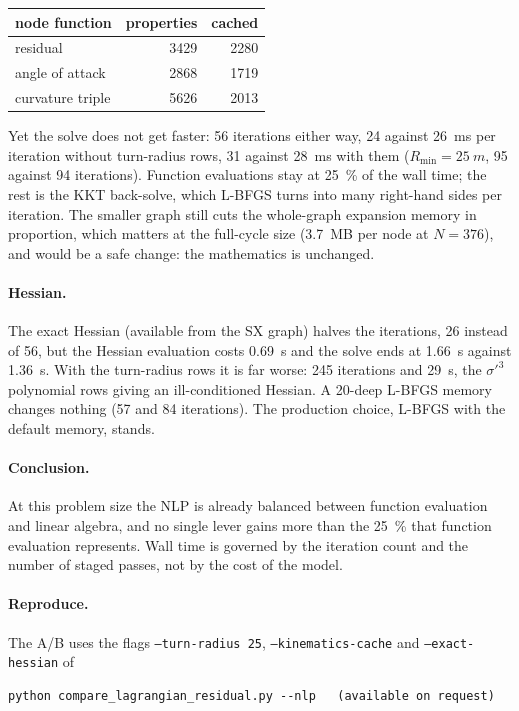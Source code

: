 \documentclass[11pt,a4paper]{article}
\newcommand{\code}[1]{\texttt{#1}}
\begin{document}
\begin{center}
\begin{tabular}{lrr}
\toprule
node function & properties & cached \\
\midrule
residual & 3429 & 2280 \\
angle of attack & 2868 & 1719 \\
curvature triple & 5626 & 2013 \\
\bottomrule
\end{tabular}
\end{center}

Yet the solve does not get faster: 56 iterations either way, 24 against
\SI{26}{ms} per iteration without turn-radius rows, 31 against \SI{28}{ms}
with them ($R_\mathrm{min} = \SI{25}{m}$, 95 against 94 iterations). Function
evaluations stay at \SI{25}{\percent} of the wall time; the rest is the KKT
back-solve, which L-BFGS turns into many right-hand sides per iteration. The
smaller graph still cuts the whole-graph expansion memory in proportion, which
matters at the full-cycle size (\SI{3.7}{MB} per node at $N = 376$), and would
be a safe change: the mathematics is unchanged.

\paragraph{Hessian.} The exact Hessian (available from the SX graph) halves the
iterations, 26 instead of 56, but the Hessian evaluation costs \SI{0.69}{s}
and the solve ends at \SI{1.66}{s} against \SI{1.36}{s}. With the turn-radius
rows it is far worse: 245 iterations and \SI{29}{s}, the $\sigma'^3$
polynomial rows giving an ill-conditioned Hessian. A 20-deep L-BFGS memory
changes nothing (57 and 84 iterations). The production choice, L-BFGS with the
default memory, stands.

\paragraph{Conclusion.} At this problem size the NLP is already balanced
between function evaluation and linear algebra, and no single lever gains
more than the \SI{25}{\percent} that function evaluation represents. Wall time
is governed by the iteration count and the number of staged passes, not by
the cost of the model.

\paragraph{Reproduce.} The A/B uses the flags \code{--turn-radius 25},
\code{--kinematics-cache} and \code{--exact-hessian} of
{\small
\begin{verbatim}
python compare_lagrangian_residual.py --nlp   (available on request)
\end{verbatim}
}
\end{document}
